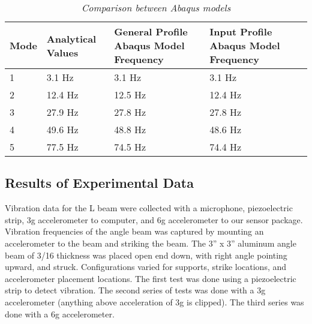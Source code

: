 \begin{table}[H]
\begin{center}
\begin{tabular}{|l| p{3.5cm}| p{3cm}| p{3cm}| p{3cm}|}
\hline
\textbf{Mode} & \textbf{Analytical Values} & \textbf{General Profile Abaqus Model Frequency}& \textbf{Input Profile Abaqus Model Frequency} \\\hline
1    & 3.1 Hz            & 3.1 Hz                             & 3.1 Hz     \\\hline
2    & 12.4 Hz           & 12.5 Hz                            & 12.4 Hz     \\\hline
3    & 27.9 Hz           & 27.8 Hz                            & 27.8 Hz     \\\hline
4    & 49.6 Hz           & 48.8 Hz                            & 48.6 Hz      \\\hline
5    & 77.5 Hz           & 74.5 Hz                            & 74.4 Hz    \\\hline
\end{tabular}
\caption{\textit{Comparison between Abaqus models}}
\label{tab:FEM_Abaqus_Comp}
\end{center}
\end{table}

\subsection{Results of Experimental Data}
\indent Vibration data for the L beam were collected with a microphone, piezoelectric strip, 3g accelerometer to computer, and 6g accelerometer to our
sensor package. Vibration frequencies of the angle beam was captured by mounting an accelerometer to the beam and striking the beam. The 3” x 3” aluminum
angle beam of 3/16 thickness was placed open end down, with right angle pointing upward, and struck. Configurations varied for supports, strike
locations, and accelerometer placement locations. The first test was done using a piezoelectric strip to detect vibration. The second series of tests was done with a 3g accelerometer (anything above acceleration of 3g is clipped). The third series was done with a 6g accelerometer.

